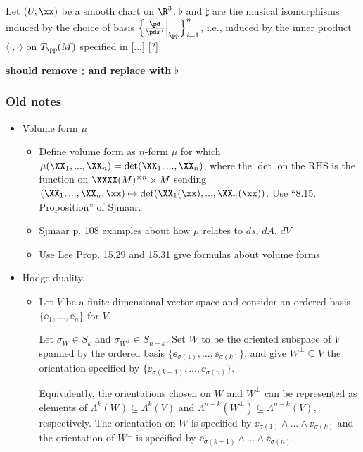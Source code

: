 Let $(U, \xx)$ be a smooth chart on $\R^3$. $\flat$ and $\sharp$ are the musical isomorphisms induced by the choice of basis $\Big\{ \frac{\pd}{\pd x^i}\Big|_\pp \Big\}_{i = 1}^n$, i.e., induced by the inner product $\langle \cdot, \cdot \rangle$ on $T_\pp(M)$ specified in [...] [?] 

\textbf{should remove $\natural$ and replace with $\flat$}

\subsubsection{Old notes}

\begin{itemize}
    \item Volume form $\mu$
        \begin{itemize}
            \item Define volume form as $n$-form $\mu$ for which $\mu(\XX_1, ..., \XX_n) = \det(\XX_1, ..., \XX_n)$, where the $\det$ on the RHS is the function on $\XXXX(M)^{\times n} \times M$ sending $(\XX_1, ..., \XX_n, \xx) \mapsto \det(\XX_1(\xx), ..., \XX_n(\xx))$. Use ``8.15. Proposition'' of Sjmaar.
            \item Sjmaar p. 108 examples about how $\mu$ relates to $ds$, $dA$, $dV$
            \item Use Lee Prop. 15.29 and 15.31 give formulas about volume forms
        \end{itemize}

    \item Hodge duality.
        \begin{itemize}
            \item Let $V$ be a finite-dimensional vector space and consider an ordered basis $\{\ee_1, ..., \ee_n\}$ for $V$.
            
            Let $\sigma_W \in S_k$ and $\sigma_{W^\perp} \in S_{n - k}$. Set $W$ to be the oriented subspace of $V$ spanned by the ordered basis $\{\ee_{\sigma(1)}, ..., \ee_{\sigma(k)}\}$, and give $W^\perp \subseteq V$ the orientation specified by $\{\ee_{\sigma(k + 1)}, ..., \ee_{\sigma(n)}\}$.
            
            Equivalently, the orientations chosen on $W$ and $W^\perp$ can be represented as elements of $\Lambda^k(W) \subseteq \Lambda^k(V)$ and $\Lambda^{n - k}(W^\perp) \subseteq \Lambda^{n - k}(V)$, respectively. The orientation on $W$ is specified by $\ee_{\sigma(1)} \wedge ... \wedge \ee_{\sigma(k)}$ and the orientation of $W^\perp$ is specified by $\ee_{\sigma(k + 1)} \wedge ... \wedge \ee_{\sigma(n)}$.
            

\end{itemize}
\end{itemize}
